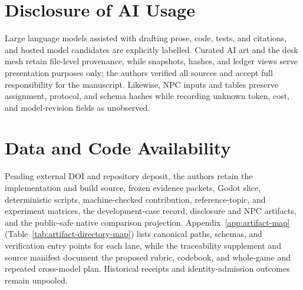 \documentclass[journal]{IEEEtran}
\begin{document}
\begingroup
\section*{Disclosure of AI Usage}
Large language models assisted with drafting prose, code, tests, and citations, and hosted model candidates are explicitly labelled. Curated AI art and the desk mesh retain file-level provenance, while snapshots, hashes, and ledger views serve presentation purposes only; the authors verified all sources and accept full responsibility for the manuscript. Likewise, NPC inputs and tables preserve assignment, protocol, and schema hashes while recording unknown token, cost, and model-revision fields as unobserved.

\section*{Data and Code Availability}
Pending external DOI and repository deposit, the authors retain the implementation and build source, frozen evidence packets, Godot slice, deterministic scripts, machine-checked contribution, reference-topic, and experiment matrices, the development-case record, disclosure and NPC artifacts, and the public-safe native comparison projection. Appendix~\ref{app:artifact-map} (Table~\ref{tab:artifact-directory-map}) lists canonical paths, schemas, and verification entry points for each lane, while the traceability supplement and source manifest document the proposed rubric, codebook, and whole-game and repeated cross-model plan. Historical receipts and identity-admission outcomes remain unpooled.

\clearpage


\endgroup

\clearpage
\onecolumn
\appendices
\end{document}
